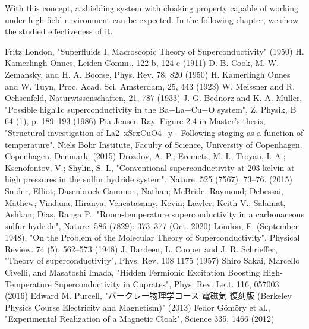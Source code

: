 With this concept, a shielding system with cloaking property capable of working under high field environment can be expected.
In the following chapter, we show the studied effectiveness of it.


\newpage
\begin{thebibliography}{20}
   Fritz London, "Superfluids I, Macroscopic Theory of Superconductivity" (1950)
   H. Kamerlingh Onnes, Leiden Comm., 122 b, 124 c (1911)
   D. B. Cook, M. W. Zemansky, and H. A. Boorse, Phys. Rev. 78, 820 (1950)
   H. Kamerlingh Onnes and W. Tuyn, Proc. Acad. Sci. Amsterdam, 25, 443 (1923)
   W. Meissner and R. Ochsenfeld, Naturwissenschaften, 21, 787 (1933)
   J. G. Bednorz and K. A. Müller, "Possible highTc superconductivity in the Ba−La−Cu−O system", Z. Physik, B 64 (1), p. 189–193 (1986)
   Pia Jensen Ray. Figure 2.4 in Master's thesis, "Structural investigation of La2–xSrxCuO4+y - Following staging as a function of temperature". Niels Bohr Institute, Faculty of Science, University of Copenhagen. Copenhagen, Denmark. (2015)
   Drozdov, A. P.; Eremets, M. I.; Troyan, I. A.; Ksenofontov, V.; Shylin, S. I., "Conventional superconductivity at 203 kelvin at high pressures in the sulfur hydride system", Nature. 525 (7567): 73–76. (2015)
   Snider, Elliot; Dasenbrock-Gammon, Nathan; McBride, Raymond; Debessai, Mathew; Vindana, Hiranya; Vencatasamy, Kevin; Lawler, Keith V.; Salamat, Ashkan; Dias, Ranga P., "Room-temperature superconductivity in a carbonaceous sulfur hydride", Nature. 586 (7829): 373–377 (Oct. 2020)
   London, F. (September 1948). "On the Problem of the Molecular Theory of Superconductivity", Physical Review. 74 (5): 562–573 (1948)
   J. Bardeen, L. Cooper and J. R. Schrieffer, "Theory of superconductivity", Phys. Rev. 108 1175 (1957)
   Shiro Sakai, Marcello Civelli, and Masatoshi Imada, "Hidden Fermionic Excitation Boosting High-Temperature Superconductivity in Cuprates", Phys. Rev. Lett. 116, 057003 (2016)
   Edward M. Purcell, "バークレー物理学コース 電磁気 復刻版 (Berkeley Physics Course Electricity and Magnetism)" (2013)
   Fedor Gömöry et al., "Experimental Realization of a Magnetic Cloak", Science 335, 1466 (2012)
\end{thebibliography}
